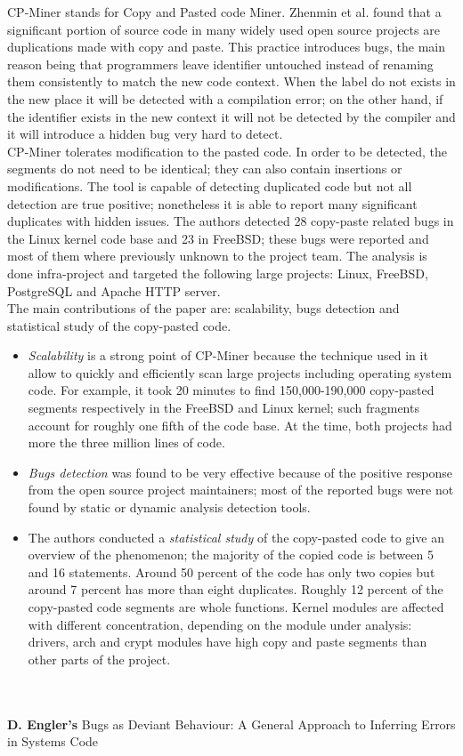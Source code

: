 CP-Miner stands for Copy and Pasted code Miner. Zhenmin et al. found that a significant portion of source code in many widely used open source projects are duplications made with copy and paste. This practice introduces bugs, the main reason being that programmers leave identifier untouched instead of renaming them consistently to match the new code context. When the label do not exists in the new place it will be detected with a compilation error; on the other hand, if the identifier exists in the new context it will not be detected by the compiler and it will introduce a hidden bug very hard to detect.\\
CP-Miner tolerates modification to the pasted code. In order to be detected, the segments do not need to be identical; they can also contain insertions or modifications. The tool is capable of detecting duplicated code but not all detection are true positive; nonetheless it is able to report many significant duplicates with hidden issues. The authors detected 28 copy-paste related bugs in the Linux kernel code base and 23 in FreeBSD; these bugs were reported and most of them where previously unknown to the project team.
The analysis is done infra-project and targeted the following large projects: Linux, FreeBSD, PostgreSQL and Apache HTTP server.
\\
The main contributions of the paper are: scalability, bugs detection and statistical study of the copy-pasted code. 
\begin{itemize}
    \item \emph{Scalability} is a strong point of CP-Miner because the technique used in it allow to quickly and efficiently scan large projects including operating system code. For example, it took 20 minutes to find 150,000-190,000 copy-pasted segments respectively in the FreeBSD and Linux kernel; such fragments account for roughly one fifth of the code base. At the time, both projects had more the three million lines of code. 
    \item \emph{Bugs detection} was found to be very effective because of the positive response from the open source project maintainers; most of the reported bugs were not found by static or dynamic analysis detection tools. 
    \item The authors conducted a \emph{statistical study} of the copy-pasted code to give an overview of the phenomenon; the majority of the copied code is between 5 and 16 statements. Around 50 percent of the code has only two copies but around 7 percent has more than eight duplicates. Roughly 12 percent of the copy-pasted code segments are whole functions. Kernel modules are affected with different concentration, depending on the module under analysis: drivers, arch and crypt modules have high copy and paste segments than other parts of the project.
\end{itemize}
\\
\\
\textbf{D. Engler's} \cite{engler2001bugs} Bugs as Deviant Behaviour: A General Approach to Inferring Errors in Systems Code

